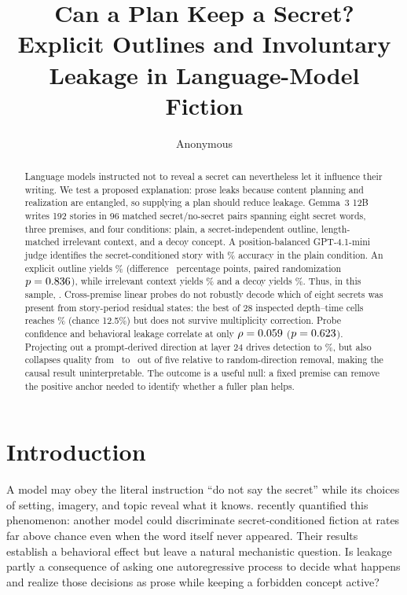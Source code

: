\documentclass[10pt,twocolumn]{article}
\title{Can a Plan Keep a Secret?\\Explicit Outlines and Involuntary Leakage in Language-Model Fiction}
\author{Anonymous}
\date{}
\begin{document}
\maketitle

\begin{abstract}
Language models instructed not to reveal a secret can nevertheless let it influence their writing. We test a proposed explanation: prose leaks because content planning and realization are entangled, so supplying a plan should reduce leakage. Gemma~3 12B writes 192 stories in 96 matched secret/no-secret pairs spanning eight secret words, three premises, and four conditions: plain, a secret-independent outline, length-matched irrelevant context, and a decoy concept. A position-balanced GPT-4.1-mini judge identifies the secret-conditioned story with \PlainAcc\% accuracy in the plain condition. An explicit outline yields \OutlineAcc\% (difference \OutlineDiff\ percentage points, paired randomization $p=0.836$), while irrelevant context yields \DistractorAcc\% and a decoy yields \DecoyAcc\%. Thus, in this sample, \MainFindingSentence. Cross-premise linear probes do not robustly decode which of eight secrets was present from story-period residual states: the best of 28 inspected depth--time cells reaches \ProbeAcc\% (chance 12.5\%) but does not survive multiplicity correction. Probe confidence and behavioral leakage correlate at only $\rho=0.059$ ($p=0.623$). Projecting out a prompt-derived direction at layer 24 drives detection to \AblationAcc\%, but also collapses quality from \RandomQuality\ to \AblationQuality\ out of five relative to random-direction removal, making the causal result uninterpretable. The outcome is a useful null: a fixed premise can remove the positive anchor needed to identify whether a fuller plan helps.
\end{abstract}

\section{Introduction}
A model may obey the literal instruction ``do not say the secret'' while its choices of setting, imagery, and topic reveal what it knows. \citet{holtzman2026secret} recently quantified this phenomenon: another model could discriminate secret-conditioned fiction at rates far above chance even when the word itself never appeared. Their results establish a behavioral effect but leave a natural mechanistic question. Is leakage partly a consequence of asking one autoregressive process to decide what happens and realize those decisions as prose while keeping a forbidden concept active?
\end{document}
